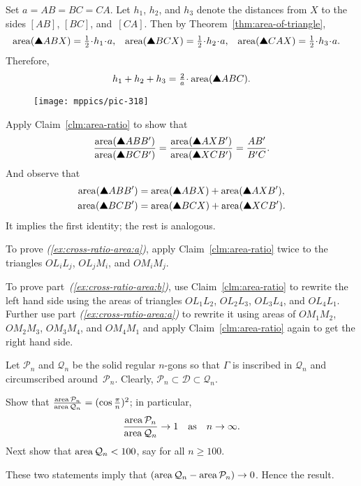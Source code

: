Set $a=AB=BC=CA$.
Let $h_1$, $h_2$, and $h_3$ denote the distances from $X$ to the sides $[AB]$, $[BC]$, and~$[CA]$. 
Then by Theorem~\ref{thm:area-of-triangle},
\begin{align*}
\area(\solidtriangle ABX)&=\tfrac12\cdot h_1\cdot a,
&
\area(\solidtriangle BCX)&=\tfrac12\cdot h_2\cdot a,
&
\area(\solidtriangle CAX)&=\tfrac12\cdot h_3\cdot a.
\end{align*}
Therefore, 
\[h_1+h_2+h_3=\tfrac2a\cdot\area(\solidtriangle ABC).\]

\begin{wrapfigure}{r}{40 mm}
\vskip4mm
\centering
\texttt{[image: mppics/pic-318]}
\end{wrapfigure}

 Apply Claim~\ref{clm:area-ratio} to show that 
\[\frac{\area(\solidtriangle ABB')}{\area(\solidtriangle BCB')}=
\frac{\area(\solidtriangle AXB')}{\area(\solidtriangle XCB')}=
\frac{AB'}{B'C}.\]
And observe that 
\begin{align*}
\area(\solidtriangle ABB')&=\area(\solidtriangle ABX)+\area(\solidtriangle AXB'),
\\
\area(\solidtriangle BCB')&=\area(\solidtriangle BCX)+\area(\solidtriangle XCB').
\end{align*}
It implies the first identity; the rest is analogous.

 To prove \textit{(\ref{ex:cross-ratio-area:a})}, apply Claim~\ref{clm:area-ratio} twice to the triangles $OL_iL_j$, $OL_jM_i$, and $OM_iM_j$.

To prove part~\textit{(\ref{ex:cross-ratio-area:b})}, use Claim~\ref{clm:area-ratio} to rewrite the left hand side using the areas of triangles $OL_1L_2$, $OL_2L_3$, $OL_3L_4$, and $OL_4L_1$.
Further use part \textit{(\ref{ex:cross-ratio-area:a})} to rewrite it using areas of $OM_1M_2$, $OM_2M_3$, $OM_3M_4$, and $OM_4M_1$ and apply Claim~\ref{clm:area-ratio} again to get the right hand side.


Let $\mathcal{P}_n$ and $\mathcal{Q}_n$ be the solid regular $n$-gons
so that $\Gamma$ is inscribed in $\mathcal{Q}_n$ and circumscribed around~$\mathcal{P}_n$.
Clearly,
$\mathcal{P}_n\subset\mathcal{D}\subset\mathcal{Q}_n$.

Show that 
$\tfrac{\mathop{\rm area}\nolimits\mathcal{P}_n}{\mathop{\rm area}\nolimits\mathcal{Q}_n}=(\cos\tfrac\pi n)^2$;
in particular, 
$$\frac{\mathop{\rm area}\nolimits\mathcal{P}_n}{\mathop{\rm area}\nolimits\mathcal{Q}_n}\to 1
\quad
\text{as}
\quad
n\to\infty.$$
Next show that $\mathop{\rm area}\nolimits\mathcal{Q}_n<100$, say for all $n\ge 100$.

These two statements imply that
$(\mathop{\rm area}\nolimits\mathcal{Q}_n-\mathop{\rm area}\nolimits\mathcal{P}_n)\to 0$.
Hence the result.

\newpage
